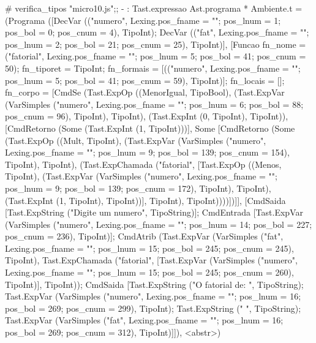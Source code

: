 \documentclass[12pt,a4paper,twoside]{article}
\begin{document}
\begin{terminal}
             
# verifica_tipos "micro10.js";;
- : Tast.expressao Ast.programa * Ambiente.t =
(Programa
  ([DecVar
     (("numero",
       {Lexing.pos_fname = ""; pos_lnum = 1; pos_bol = 0; pos_cnum = 4}),
     TipoInt);
    DecVar
     (("fat",
       {Lexing.pos_fname = ""; pos_lnum = 2; pos_bol = 21; pos_cnum = 25}),
     TipoInt)],
  [Funcao
    {fn_nome =
      ("fatorial",
       {Lexing.pos_fname = ""; pos_lnum = 5; pos_bol = 41; pos_cnum = 50});
     fn_tiporet = TipoInt;
     fn_formais =
      [(("numero",
         {Lexing.pos_fname = ""; pos_lnum = 5; pos_bol = 41; pos_cnum = 59}),
        TipoInt)];
     fn_locais = [];
     fn_corpo =
      [CmdSe
        (Tast.ExpOp ((MenorIgual, TipoBool),
          (Tast.ExpVar
            (VarSimples
              ("numero",
               {Lexing.pos_fname = ""; pos_lnum = 6; pos_bol = 88;
                pos_cnum = 96}),
            TipoInt),
           TipoInt),
          (Tast.ExpInt (0, TipoInt), TipoInt)),
        [CmdRetorno (Some (Tast.ExpInt (1, TipoInt)))],
        Some
         [CmdRetorno
           (Some
             (Tast.ExpOp ((Mult, TipoInt),
               (Tast.ExpVar
                 (VarSimples
                   ("numero",
                    {Lexing.pos_fname = ""; pos_lnum = 9; pos_bol = 139;
                     pos_cnum = 154}),
                 TipoInt),
                TipoInt),
               (Tast.ExpChamada ("fatorial",
                 [Tast.ExpOp ((Menos, TipoInt),
                   (Tast.ExpVar
                     (VarSimples
                       ("numero",
                        {Lexing.pos_fname = ""; pos_lnum = 9; pos_bol = 139;
                         pos_cnum = 172}),
                     TipoInt),
                    TipoInt),
                   (Tast.ExpInt (1, TipoInt), TipoInt))],
                 TipoInt),
                TipoInt))))])]}],
  [CmdSaida [Tast.ExpString ("Digite um numero", TipoString)];
   CmdEntrada
    [Tast.ExpVar
      (VarSimples
        ("numero",
         {Lexing.pos_fname = ""; pos_lnum = 14; pos_bol = 227;
          pos_cnum = 236}),
      TipoInt)];
   CmdAtrib
    (Tast.ExpVar
      (VarSimples
        ("fat",
         {Lexing.pos_fname = ""; pos_lnum = 15; pos_bol = 245;
          pos_cnum = 245}),
      TipoInt),
    Tast.ExpChamada ("fatorial",
     [Tast.ExpVar
       (VarSimples
         ("numero",
          {Lexing.pos_fname = ""; pos_lnum = 15; pos_bol = 245;
           pos_cnum = 260}),
       TipoInt)],
     TipoInt));
   CmdSaida
    [Tast.ExpString ("O fatorial de: ", TipoString);
     Tast.ExpVar
      (VarSimples
        ("numero",
         {Lexing.pos_fname = ""; pos_lnum = 16; pos_bol = 269;
          pos_cnum = 299}),
      TipoInt);
     Tast.ExpString (" ", TipoString);
     Tast.ExpVar
      (VarSimples
        ("fat",
         {Lexing.pos_fname = ""; pos_lnum = 16; pos_bol = 269;
          pos_cnum = 312}),
      TipoInt)]]),
 <abstr>)
\end{terminal}
\end{document}
